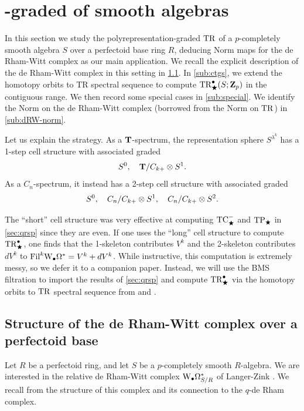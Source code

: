 %
\section{-graded  of smooth algebras}
\label{sec:dRW}

\newcommand{\untwist}{\smash{{}^{\fade{\scriptscriptstyle\phi^{-1}}}}}
\newcommand{\thh}{\THH(S;\Z_p)}

In this section we study the polyrepresentation-graded $\TR$ of a $p$-completely smooth algebra $S$ over a perfectoid base ring $R$, deducing Norm maps for the de Rham-Witt complex as our main application. We recall the explicit description of the de Rham-Witt complex in this setting in \sec\ref{sub:dRW-perfd}. In \sec\ref{sub:ctgs}, we extend the homotopy orbits to TR spectral sequence to compute $\TR^\bullet_\rog(S;\Z_p)$ in the contiguous range. We then record some special cases in \sec\ref{sub:special}. We identify the Norm on the de Rham-Witt complex (borrowed from the Norm on $\TR$) in \sec\ref{sub:dRW-norm}.

Let us explain the strategy. As a $\T$-spectrum, the representation sphere $S^{\lambda^k}$ has a 1-step cell structure with associated graded
\[ S^0,\quad\T/C_{k+}\tnsr S^1. \]
As a $C_n$-spectrum, it instead has a 2-step cell structure with associated graded
\[ S^0,\quad C_n/C_{k+}\tnsr S^1,\quad C_n/C_{k+}\tnsr S^2. \]

The ``short'' cell structure was very effective at computing $\TCmin_\rog$ and $\TP_\rog$ in \sec\ref{sec:qrsp} since they are even. If one uses the ``long'' cell structure to compute $\TR^\bullet_\rog$, one finds that the 1-skeleton contributes $V^k$ and the 2-skeleton contributes $dV^k$ to $\Fil^k\dRW[\bullet]^*=V^k + dV^k$. While instructive, this computation is extremely messy, so we defer it to a companion paper. Instead, we will use the BMS filtration to import the results of \sec\ref{sec:qrsp} and compute $\TR^\bullet_\rog$ via the homotopy orbits to $\TR$ spectral sequence from \cite[]{ROS1TR} and \cite[]{SulROGTHH}.

\subsection{Structure of the de Rham-Witt complex over a perfectoid base}
\label{sub:dRW-perfd}

Let $R$ be a perfectoid ring, and let $S$ be a $p$-completely smooth $R$-algebra. We are interested in the relative de Rham-Witt complex $\dRW[\bullet]^*_{S/R}$ of Langer-Zink \cite{LangerZinkDRW}. We recall from \cite{BMS1} the structure of this complex and its connection to the $q$-de Rham complex.

